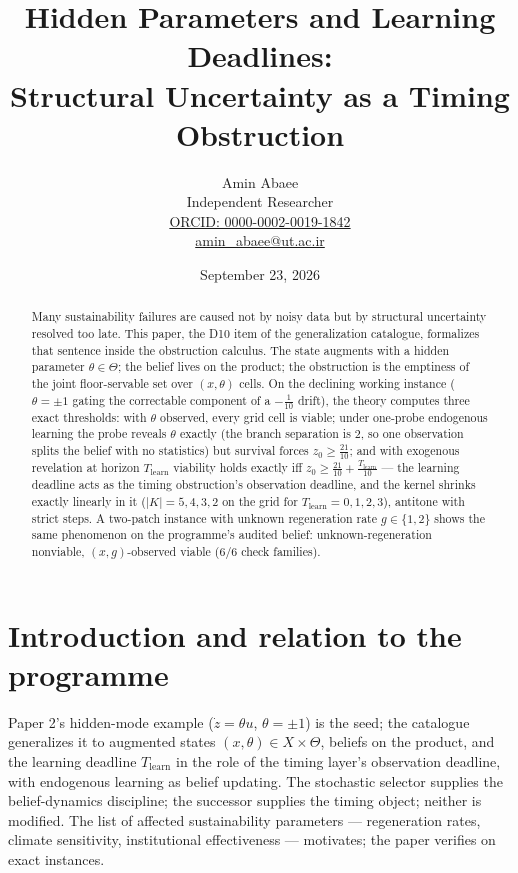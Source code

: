 \documentclass[10pt,twocolumn]{article}
\theoremstyle{definition}
\begin{document}
\title{Hidden Parameters and Learning Deadlines:\\ Structural Uncertainty as a Timing Obstruction}
\author{Amin Abaee\\[0.35em]
{\small Independent Researcher}\\[0.55em]
{\small\href{https://orcid.org/0000-0002-0019-1842}{ORCID: 0000-0002-0019-1842}}\\[0.3em]
{\small\href{mailto:amin\_abaee@ut.ac.ir}{amin\_abaee@ut.ac.ir}}}
\date{September 23, 2026}
\maketitle

\begin{abstract}
Many sustainability failures are caused not by noisy data but by structural
uncertainty resolved too late. This paper, the D10 item of the
generalization catalogue, formalizes that sentence inside the obstruction
calculus. The state augments with a hidden parameter
$\theta\in\Theta$; the belief lives on the product; the obstruction is the
emptiness of the joint floor-servable set over $(x,\theta)$ cells. On the
declining working instance ($\theta=\pm1$ gating the correctable component
of a $-\tfrac1{10}$ drift), the theory computes three exact thresholds:
with $\theta$ observed, every grid cell is viable; under one-probe
endogenous learning the probe reveals $\theta$ exactly (the branch
separation is $2$, so one observation splits the belief with no
statistics) but survival forces $z_0\ge\tfrac{21}{10}$; and with
exogenous revelation at horizon $T_{\mathrm{learn}}$ viability holds
exactly iff $z_0\ge\tfrac{21}{10}+\tfrac{T_{\mathrm{learn}}}{10}$ --- the
learning deadline acts as the timing obstruction's observation deadline,
and the kernel shrinks exactly linearly in it ($|K|=5,4,3,2$ on the grid
for $T_{\mathrm{learn}}=0,1,2,3$), antitone with strict steps. A two-patch
instance with unknown regeneration rate $g\in\{1,2\}$ shows the same
phenomenon on the programme's audited belief: unknown-regeneration
nonviable, $(x,g)$-observed viable (6/6 check families).
\end{abstract}

\section{Introduction and relation to the programme}

Paper 2's hidden-mode example ($\dot z=\theta u$, $\theta=\pm1$) is the
seed; the catalogue generalizes it to augmented states
$(x,\theta)\in X\times\Theta$, beliefs on the product, and the learning
deadline $T_{\mathrm{learn}}$ in the role of the timing layer's
observation deadline, with endogenous learning as belief updating. The
stochastic selector supplies the belief-dynamics discipline; the successor
supplies the timing object; neither is modified. The list of affected
sustainability parameters --- regeneration rates, climate sensitivity,
institutional effectiveness --- motivates; the paper verifies on exact
instances.
\end{document}
